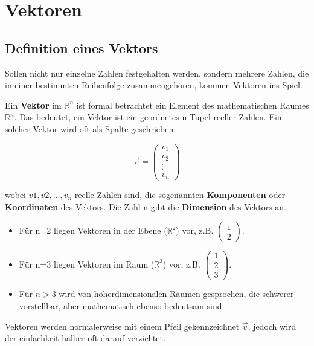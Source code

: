\chapter{Vektoren}

\section{Definition eines Vektors}

Sollen nicht nur einzelne Zahlen festgehalten werden, sondern mehrere Zahlen,
die in einer bestimmten Reihenfolge zusammengehören, kommen Vektoren ins Spiel.

Ein \textbf{Vektor} im $\mathbb{R}^n$ ist formal betrachtet ein Element des
mathematischen Raumes $\mathbb{R}^n$. Das bedeutet, ein Vektor ist ein
geordnetes n-Tupel reeller Zahlen. Ein solcher Vektor wird oft als Spalte
geschrieben:

\[
    \vec{v} = \begin{pmatrix}
        v_1 \\ v_2 \\ \vdots \\ v_n
    \end{pmatrix}
\]

wobei $v1, v2, \dots, v_n$ reelle Zahlen sind, die sogenannten
\textbf{Komponenten} oder \textbf{Koordinaten} des Vektors. Die Zahl n gibt die
\textbf{Dimension} des Vektors an.

\begin{itemize}
    \item Für n=2 liegen Vektoren in der Ebene ($\mathbb{R}^2$) vor, z.B. $\begin{pmatrix}
                  1 \\ 2
              \end{pmatrix}$.
    \item Für n=3 liegen Vektoren im Raum ($\mathbb{R}^3$) vor, z.B. $\begin{pmatrix}
                  1 \\ 2 \\ 3
              \end{pmatrix}$.
    \item Für $n > 3$ wird von höherdimensionalen Räumen gesprochen, die schwerer
          vorstellbar, aber mathematisch ebenso bedeutsam sind.
\end{itemize}

Vektoren werden normalerweise mit einem Pfeil gekennzeichnet $\vec{v}$, jedoch
wird der einfachkeit halber oft darauf verzichtet.

